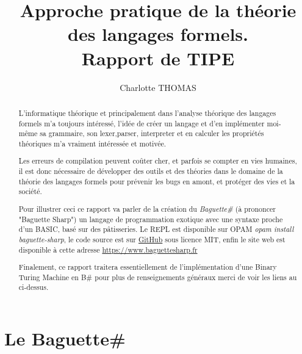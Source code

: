 \documentclass[11pt,colorlinks=true,a4paper]{article}
\title{Approche pratique de la théorie des langages formels. \\ Rapport de TIPE}
\author{Charlotte THOMAS}
\newcommand{\bsf}{Baguette\# }
\newcommand{\bs}{B\# }
\begin{document}
    \maketitle
    \begin{abstract}
        L'informatique théorique et principalement dans l'analyse théorique des langages formels m'a toujours intéressé, 
        l'idée de créer un langage et d'en implémenter moi-même sa grammaire, son lexer,parser, interpreter et en 
        calculer les propriétés théoriques m'a vraiment intéressée et motivée.

        Les erreurs de compilation peuvent coûter cher, et parfois se compter en vies humaines, il est donc 
        nécessaire de développer des outils et des théories dans le domaine de la théorie des langages formels 
        pour prévenir les bugs en amont, et protéger des vies et la société.

        Pour illustrer ceci ce rapport va parler de la création du \textit{\bsf} (à prononcer "Baguette Sharp") un langage 
        de programmation exotique avec une syntaxe proche d'un BASIC, basé sur des pâtisseries.
        Le REPL est disponible sur OPAM \textit{opam install baguette-sharp}, le code source est sur \href{https://github.com/coco33920/ocaml-baguettesharp-interpreter}{GitHub}
        sous licence MIT, enfin le site web est disponible à cette adresse \url{https://www.baguettesharp.fr}

        Finalement, ce rapport traitera essentiellement de l'implémentation d'une Binary Turing Machine en \bs pour plus 
        de renseignements généraux merci de voir les liens au ci-dessus.
    \end{abstract}
    \tableofcontents
    \listoffigures
    \cleardoublepage


    \section{Le \bsf}
\end{document}
